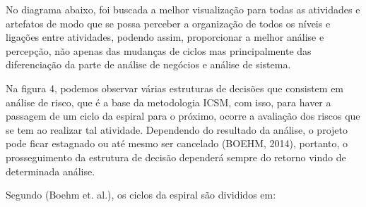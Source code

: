  No diagrama abaixo, foi buscada a melhor visualização para todas as atividades e artefatos de 
  modo que se possa perceber a organização de todos os níveis e ligações entre atividades, 
  podendo assim, proporcionar a melhor análise e percepção, não apenas das mudanças de ciclos 
  mas principalmente das diferenciação da parte de análise de negócios e análise de sistema.


  Na figura 4, podemos observar várias estruturas de decisões que consistem em análise de risco, que 
  é a base da metodologia ICSM, com isso, para haver a passagem de um ciclo da espiral para o 
  próximo, ocorre a avaliação dos riscos que se tem ao realizar tal atividade. Dependendo do resultado 
  da análise, o projeto pode ficar estagnado ou até mesmo ser cancelado (BOEHM, 2014), portanto, 
  o prosseguimento da estrutura de decisão dependerá sempre do retorno vindo de determinada análise.
  
  Segundo (Boehm et. al.), os ciclos da espiral são divididos em: 

